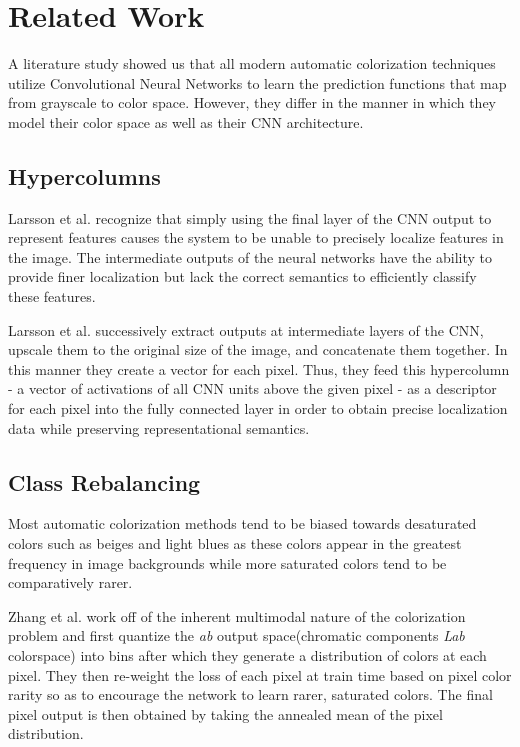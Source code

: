 \documentclass[10pt,twocolumn,letterpaper]{article}
\begin{document}
\section{Related Work}

A literature study showed us that all modern automatic colorization techniques utilize Convolutional Neural Networks to learn the prediction functions that map from grayscale to color space. However, they differ in the manner in which they model their color space as well as their CNN architecture.

\subsection{Hypercolumns}
Larsson et al.\cite{Larsson2016} recognize that simply using the final layer of the CNN output to represent features causes the system to be unable to precisely localize features in the image. The  intermediate outputs of the neural networks have the ability to provide finer localization but lack the correct semantics to efficiently classify these features.

Larsson et al. successively extract outputs at intermediate layers of the CNN, upscale them to the original size of the image, and concatenate them together. In this manner they create a vector for each pixel. Thus, they feed this hypercolumn\cite{Hariharan2015} - a vector of activations of all CNN units above the given pixel - as a descriptor for each pixel into the fully connected layer in order to obtain precise localization data while preserving representational semantics.

\subsection{Class Rebalancing}
Most automatic colorization methods tend to be biased towards desaturated colors such as beiges and light blues as these colors appear in the greatest frequency in image backgrounds while more saturated colors tend to be comparatively rarer.

Zhang et al.\cite{Zhang2016} work off of the inherent multimodal nature of the colorization problem and first quantize the \textit{ab} output space(chromatic components \textit{Lab} colorspace) into bins after which they generate a distribution of colors at each pixel. They then re-weight the loss of each pixel at train time based on pixel color rarity so as to encourage the network to learn rarer, saturated colors. The final pixel output is then obtained by taking the annealed mean of the pixel distribution.
\end{document}

